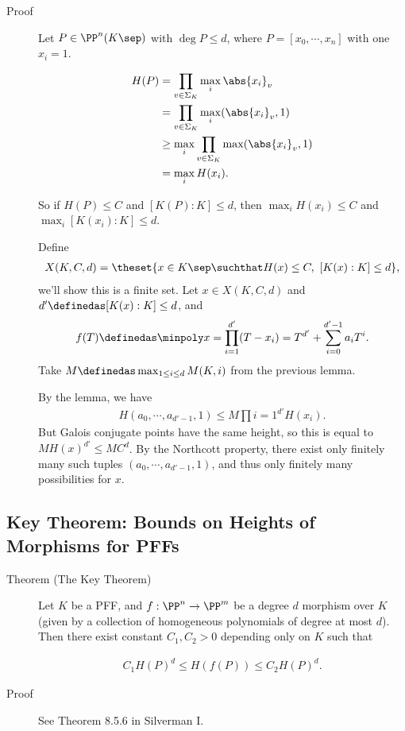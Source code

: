\begin{description}
\item[Proof]
Let \(P \in \PP^n(K\sep)\) with \(\deg P \leq d\), where
\(P = [x_0, \cdots, x_n]\) with one \(x_i = 1\).

\begin{align*}
H(P) 
&= \prod_{v\in \Sigma_K} \max_i \abs{x_i}_v \\
&= \prod_{v\in \Sigma_K} \max_i (\abs{x_i}_v  , 1) \\
&\geq \max_i \prod_{v\in \Sigma_K} \max(\abs{x_i}_v  , 1) \\
&= \max_i H(x_i)
.\end{align*}

So if \(H(P) \leq C\) and \([K(P):K] \leq d\), then
\(\max_i H(x_i) \leq C\) and \(\max_i [K(x_i): K] \leq d\).

Define
\begin{align*}X(K, C, d) = \theset{ x \in K\sep \suchthat H(x) \leq C,~ [K(x): K] \leq d  },\end{align*}
we'll show this is a finite set. Let \(x \in X(K, C, d)\) and
\(d' \definedas [K(x): K] \leq d\), and
\begin{align*}f(T) \definedas \minpoly x = \prod_{i=1}^{d'} (T - x_i) = T^{d'} + \sum_{i=0}^{d'-1} a_i T^i.\end{align*}
Take \(M\definedas \max_{1\leq i \leq d} M(K, i)\) from the previous
lemma.

By the lemma, we have
\begin{align*}H(a_0, \cdots, a_{d'-1}, 1) \leq M \prod{i=1}^{d'} H(x_i).\end{align*}
But Galois conjugate points have the same height, so this is equal to
\(M H(x)^{d'} \leq MC^d\). By the Northcott property, there exist only
finitely many such tuples \((a_0, \cdots, a_{d'-1}, 1)\), and thus only
finitely many possibilities for \(x\).
\end{description}

\hypertarget{key-theorem-bounds-on-heights-of-morphisms-for-pffs}{%
\subsection{Key Theorem: Bounds on Heights of Morphisms for
PFFs}\label{key-theorem-bounds-on-heights-of-morphisms-for-pffs}}

\begin{description}
\item[Theorem (The Key Theorem)]
Let \(K\) be a PFF, and \(f: \PP^n \to \PP^m\) be a degree \(d\)
morphism over \(K\) (given by a collection of homogeneous polynomials of
degree at most \(d\)). Then there exist constant \(C_1, C_2 > 0\)
depending only on \(K\) such that

\begin{align*}
C_1 H(P)^d \leq H(f(P)) \leq C_2 H(P)^d
.\end{align*}
\item[Proof]
See Theorem 8.5.6 in Silverman I.
\end{description}

